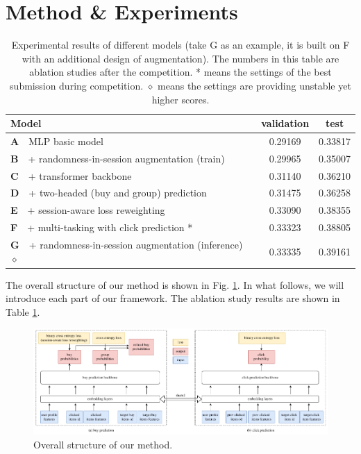 \section{Method \& Experiments} \label{sec:method}

\begin{table}[t!]
    \centering
    \caption{Experimental results of different models (take G as an example, it is built on F with an additional design of augmentation). The numbers in this table are ablation studies after the competition. * means the settings of the best submission during competition. $\diamond$ means the settings are providing unstable yet higher scores.}
    \begin{tabular}{l|c|c} \hline
        Model & validation & test \\\hline
        \textbf{A}~~MLP basic model & 0.29169 & 0.33817 \\
        \textbf{B}~~+ randomness-in-session augmentation (train) & 0.29965 & 0.35007 \\
        \textbf{C}~~+ transformer backbone & 0.31140 & 0.36210 \\
        \textbf{D}~~+ two-headed (buy and group) prediction & 0.31475 & 0.36258 \\
        \textbf{E}~~+ session-aware loss reweighting & 0.33090 & 0.38355 \\
        \textbf{F}~~+ multi-tasking with click prediction * & 0.33323 & 0.38805 \\
        \textbf{G}~~+ randomness-in-session augmentation (inference) $\diamond$ & 0.33335 & 0.39161 \\\hline
    \end{tabular}
    \label{tab:ablation}
\end{table}

The overall structure of our method is shown in Fig. \ref{fig:net}. 
In what follows, we will introduce each part of our framework.
The ablation study results are shown in Table \ref{tab:ablation}.

\begin{figure}[htbp]
    \centering
    \includegraphics[width=\linewidth]{figures/net.pdf}
    \caption{Overall structure of our method.}
    \label{fig:net}
\end{figure}

